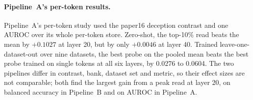 \paragraph{Pipeline~A's per-token results.}
Pipeline~A's per-token study used the paper16 deception contrast and one AUROC over its whole per-token store. %
Zero-shot, the top-10\% read beats the mean by $+0.1027$ at layer 20, but by only $+0.0046$ at layer 40. %
Trained leave-one-dataset-out over nine datasets, the best probe on the pooled mean beats the best probe trained on single tokens at all six layers, by 0.0276 to 0.0604. %
The two pipelines differ in contrast, bank, dataset set and metric, so their effect sizes are not comparable; both find the largest gain from a peak read at layer 20, on balanced accuracy in Pipeline~B and on AUROC in Pipeline~A. %


